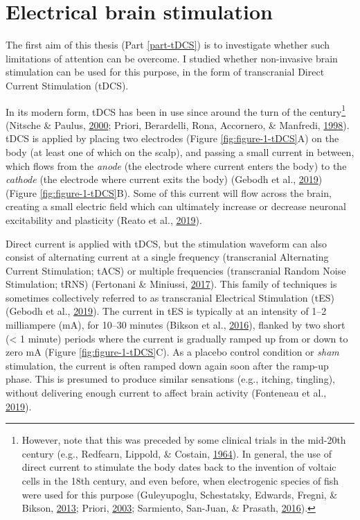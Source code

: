 \documentclass[12pt,a4paper,oldfontcommands]{memoir}
\let\rmarkdownfootnote\footnote%
\def\footnote{\protect\rmarkdownfootnote}
\begin{document}
\hypertarget{electrical-brain-stimulation}{%
\section{Electrical brain stimulation}\label{electrical-brain-stimulation}}

The first aim of this thesis (Part \ref{part-tDCS}) is to investigate whether such limitations of attention can be overcome. I studied whether non-invasive brain stimulation can be used for this purpose, in the form of transcranial Direct Current Stimulation (tDCS).

In its modern form, tDCS has been in use since around the turn of the century\footnote{However, note that this was preceded by some clinical trials in the mid-20th century (e.g., Redfearn, Lippold, \& Costain, \protect\hyperlink{ref-Redfearn1964}{1964}). In general, the use of direct current to stimulate the body dates back to the invention of voltaic cells in the 18th century, and even before, when electrogenic species of fish were used for this purpose (Guleyupoglu, Schestatsky, Edwards, Fregni, \& Bikson, \protect\hyperlink{ref-Guleyupoglu2013}{2013}; Priori, \protect\hyperlink{ref-Priori2003}{2003}; Sarmiento, San-Juan, \& Prasath, \protect\hyperlink{ref-Sarmiento2016}{2016}).} (Nitsche \& Paulus, \protect\hyperlink{ref-Nitsche2000}{2000}; Priori, Berardelli, Rona, Accornero, \& Manfredi, \protect\hyperlink{ref-Priori1998}{1998}). tDCS is applied by placing two electrodes (Figure \ref{fig:figure-1-tDCS}A) on the body (at least one of which on the scalp), and passing a small current in between, which flows from the \emph{anode} (the electrode where current enters the body) to the \emph{cathode} (the electrode where current exits the body) (Gebodh et al., \protect\hyperlink{ref-Gebodh2019a}{2019}) (Figure \ref{fig:figure-1-tDCS}B). Some of this current will flow across the brain, creating a small electric field which can ultimately increase or decrease neuronal excitability and plasticity (Reato et al., \protect\hyperlink{ref-Reato2019}{2019}).

Direct current is applied with tDCS, but the stimulation waveform can also consist of alternating current at a single frequency (transcranial Alternating Current Stimulation; tACS) or multiple frequencies (transcranial Random Noise Stimulation; tRNS) (Fertonani \& Miniussi, \protect\hyperlink{ref-Fertonani2017}{2017}). This family of techniques is sometimes collectively referred to as transcranial Electrical Stimulation (tES) (Gebodh et al., \protect\hyperlink{ref-Gebodh2019a}{2019}). The current in tES is typically at an intensity of 1--2 milliampere (mA), for 10--30 minutes (Bikson et al., \protect\hyperlink{ref-Bikson2016}{2016}), flanked by two short (\textless{} 1 minute) periods where the current is gradually ramped up from or down to zero mA (Figure \ref{fig:figure-1-tDCS}C). As a placebo control condition or \emph{sham} stimulation, the current is often ramped down again soon after the ramp-up phase. This is presumed to produce similar sensations (e.g., itching, tingling), without delivering enough current to affect brain activity (Fonteneau et al., \protect\hyperlink{ref-Fonteneau2019}{2019}).
\end{document}
